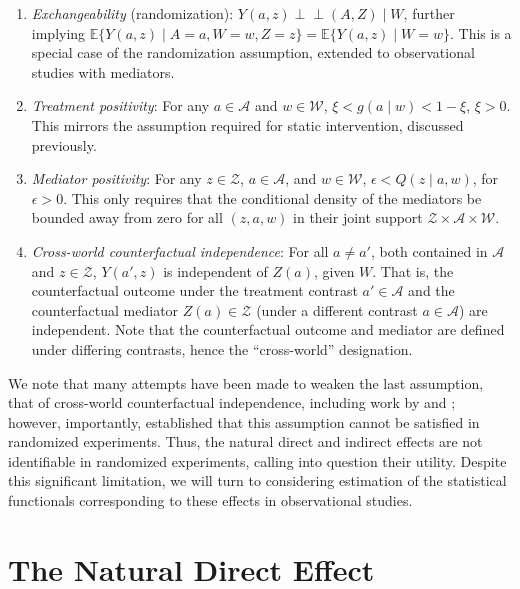 \documentclass[
  12pt, krantz2,
]{krantz}
\providecommand{\tightlist}{%
  \setlength{\itemsep}{0pt}\setlength{\parskip}{0pt}}
\theoremstyle{definition}
\theoremstyle{definition}
\theoremstyle{definition}
\newcommand{\E}{\mathbb{E}}
\newcommand{\1}{\mathbbm{1}}
\newcommand{\indep}{\mbox{$\perp\!\!\!\perp$}}
\begin{document}
\begin{enumerate}
\def\labelenumi{\arabic{enumi}.}
\tightlist
\item
  \emph{Exchangeability} (randomization): \(Y(a, z) \indep (A, Z) \mid W\), further
  implying \(\E\{Y(a, z) \mid A=a, W=w, Z=z\} = \E\{Y(a, z) \mid W=w\}\). This
  is a special case of the randomization assumption, extended to observational
  studies with mediators.
\item
  \emph{Treatment positivity}: For any \(a \in \mathcal{A}\) and \(w \in \mathcal{W}\), \(\xi < g(a \mid w) < 1 - \xi\), \(\xi > 0\). This mirrors the
  assumption required for static intervention, discussed previously.
\item
  \emph{Mediator positivity}: For any \(z \in \mathcal{Z}\), \(a \in \mathcal{A}\), and
  \(w \in \mathcal{W}\), \(\epsilon < Q(z \mid a, w)\), for \(\epsilon > 0\). This
  only requires that the conditional density of the mediators be bounded away
  from zero for all \((z, a, w)\) in their joint support \(\mathcal{Z} \times \mathcal{A} \times \mathcal{W}\).
\item
  \emph{Cross-world counterfactual independence}: For all \(a \neq a'\), both
  contained in \(\mathcal{A}\) and \(z \in \mathcal{Z}\), \(Y(a', z)\) is independent
  of \(Z(a)\), given \(W\). That is, the counterfactual outcome under the treatment
  contrast \(a' \in \mathcal{A}\) and the counterfactual mediator \(Z(a) \in \mathcal{Z}\) (under a different contrast \(a \in \mathcal{A}\)) are
  independent. Note that the counterfactual outcome and mediator are defined
  under differing contrasts, hence the ``cross-world'' designation.
\end{enumerate}

We note that many attempts have been made to weaken the last assumption, that of
cross-world counterfactual independence, including work by
\citet{petersen2006estimation} and \citet{imai2010identification}; however, importantly,
\citet{robins2010alternative} established that this assumption cannot be satisfied in
randomized experiments. Thus, the natural direct and indirect effects are not
identifiable in randomized experiments, calling into question their utility.
Despite this significant limitation, we will turn to considering estimation of
the statistical functionals corresponding to these effects in observational
studies.

\hypertarget{the-natural-direct-effect}{%
\section{The Natural Direct Effect}\label{the-natural-direct-effect}}
\end{document}
